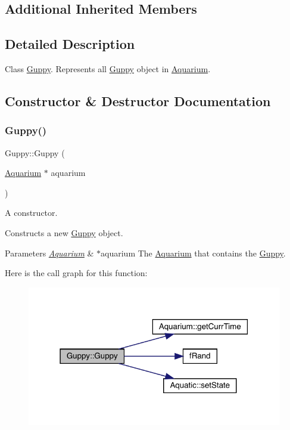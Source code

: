 \subsection*{Additional Inherited Members}


\subsection{Detailed Description}
Class \mbox{\hyperlink{class_guppy}{Guppy}}. Represents all \mbox{\hyperlink{class_guppy}{Guppy}} object in \mbox{\hyperlink{class_aquarium}{Aquarium}}. 

\subsection{Constructor \& Destructor Documentation}
\mbox{\label{class_guppy_a6c371372fd43565bf663ec29631d1daa}} 
\subsubsection{\texorpdfstring{Guppy()}{Guppy()}}
{\footnotesize\ttfamily Guppy\+::\+Guppy (\begin{DoxyParamCaption}\item[{\mbox{\hyperlink{class_aquarium}{Aquarium}} $\ast$}]{aquarium }\end{DoxyParamCaption})}



A constructor. 

Constructs a new \mbox{\hyperlink{class_guppy}{Guppy}} object. 
\begin{DoxyParams}{Parameters}
{\em \mbox{\hyperlink{class_aquarium}{Aquarium}}} & $\ast$aquarium The \mbox{\hyperlink{class_aquarium}{Aquarium}} that contains the \mbox{\hyperlink{class_guppy}{Guppy}}. \\
\hline
\end{DoxyParams}
Here is the call graph for this function\+:\nopagebreak
\begin{figure}[H]
\begin{center}
\leavevmode
\includegraphics[width=316pt]{class_guppy_a6c371372fd43565bf663ec29631d1daa_cgraph}
\end{center}
\end{figure}


